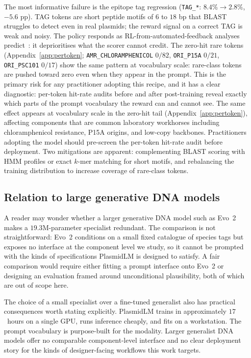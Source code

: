 \documentclass{article}
\begin{document}
The most informative failure is the epitope tag regression (\texttt{TAG\_*}:
$8.4\%\!\to\!2.8\%$, $-5.6$ pp). TAG tokens are short peptide motifs of $6$ to $18$ bp
that BLAST struggles to detect even in real plasmids; the reward signal on a correct TAG
is weak and noisy. The policy responds as RL-from-automated-feedback analyses
predict~\citep{skalse2022goodhart,krakovna2020specification}: it deprioritises what the
scorer cannot credit. The zero-hit rare tokens (Appendix~\ref{app:pertoken};
\texttt{AMR\_CHLORAMPHENICOL} $0/82$, \texttt{ORI\_P15A} $0/21$, \texttt{ORI\_PSC101}
$0/17$) show the same pattern at vocabulary scale: rare-class tokens are pushed toward
zero even when they appear in the prompt. This is the primary risk for any practitioner
adopting this recipe, and it has a clear diagnostic: per-token hit-rate audits before
and after post-training reveal exactly which parts of the prompt vocabulary the reward
can and cannot see. The same effect appears at vocabulary scale in the zero-hit tail
(Appendix~\ref{app:pertoken}), affecting components that are common laboratory
workhorses including chloramphenicol resistance, P15A origins, and low-copy backbones.
Practitioners adopting the model should pre-screen the per-token hit-rate audit before
deployment. Two mitigations are apparent: complementing BLAST scoring with HMM profiles
or exact $k$-mer matching for short motifs, and rebalancing the training distribution
to increase coverage of rare-class tokens.

\subsection{Relation to large generative DNA models}

A reader may wonder whether a larger generative DNA model such as
Evo~2~\citep{brixi2025evo2} makes a $19.3$M-parameter specialist redundant. The
comparison is not straightforward: Evo~2 conditions on a small fixed catalogue of
species tags but exposes no interface at the component level we study, so it cannot be
prompted with the kinds of specifications PlasmidLM is designed to satisfy. A fair
comparison would require either fitting a prompt interface onto Evo~2 or designing an
evaluation framed around unconditional plausibility, both of which are out of scope here.

The choice of a small specialist over a fine-tuned generalist also has practical
consequences worth stating explicitly. PlasmidLM trains in approximately $17$~hours on a
single GPU, runs inference cheaply, and fits on a workstation. The prompt vocabulary is
purpose-built for the modality. Larger generalist DNA models offer no comparable
component-level interface and no clear deployment story for the kinds of designer-facing
workflows this work targets.
\end{document}
